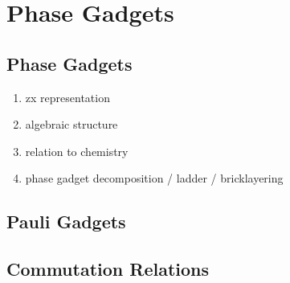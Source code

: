 \chapter{\label{phase-gadgets}Phase Gadgets}

\section{Phase Gadgets}
\begin{enumerate}
    \item zx representation
    \item algebraic structure
    \item relation to chemistry
    \item phase gadget decomposition / ladder / bricklayering
\end{enumerate}

\section{Pauli Gadgets}

\section{Commutation Relations}
